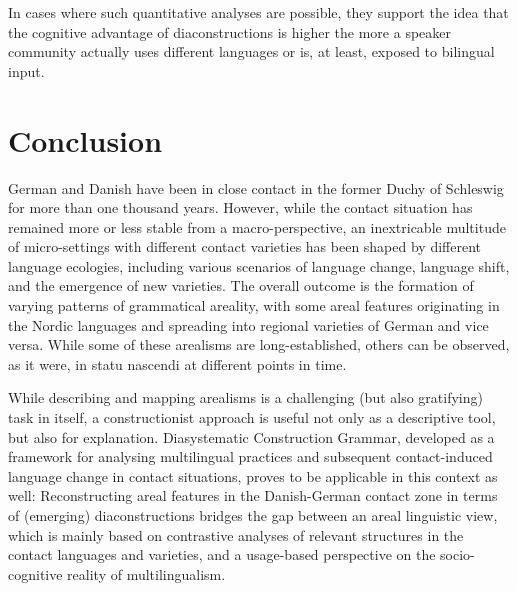 \documentclass[output=paper]{langsci/langscibook}
\begin{document}
In cases where such quantitative analyses are possible, they support the idea that the cognitive advantage of diaconstructions is higher the more a speaker community actually uses different languages or is, at least, exposed to bilingual input.


\section{Conclusion}
 \label{sec:hoeder:5}


German and Danish have been in close contact in the former Duchy of Schleswig for more than one thousand years. However, while the contact situation has remained more or less stable from a macro-perspective, an inextricable multitude of micro-settings with different contact varieties has been shaped by different language ecologies, including various scenarios of language change, language shift, and the emergence of new varieties. The overall outcome is the formation of varying patterns of grammatical areality, with some areal features originating in the Nordic languages and spreading into regional varieties of German and vice versa. While some of these arealisms are long-established, others can be observed, as it were, in statu nascendi at different points in time.

While describing and mapping arealisms is a challenging (but also gratifying) task in itself, a constructionist approach is useful not only as a descriptive tool, but also for explanation. Diasystematic Construction Grammar, developed as a framework for analysing multilingual practices and subsequent contact-induced language change in contact situations, proves to be applicable in this context as well: Reconstructing areal features in the Danish-German contact zone in terms of (emerging) diaconstructions bridges the gap between an areal linguistic view, which is mainly based on contrastive analyses of relevant structures in the contact languages and varieties, and a usage-based perspective on the socio-cognitive reality of multilingualism.

{\sloppy\printbibliography[heading=subbibliography,notkeyword=this]}
\end{document}
